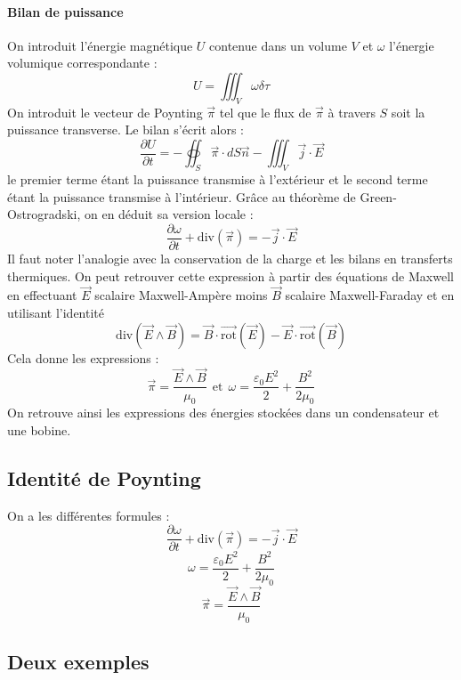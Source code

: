 \documentclass[french]{book}
\theoremstyle{plain}
\theoremstyle{definition}
\theoremstyle{remark}
\newcommand{\rot}{\overrightarrow{\text{rot}}}
\renewcommand{\div}{\text{div}}
\begin{document}
\paragraph{Bilan de puissance} On introduit l'énergie magnétique $U$ contenue dans un volume $V$ et $\omega$ l'énergie volumique correspondante : $$U=\iiint_V\omega\delta\tau$$ On introduit le vecteur de Poynting $\overrightarrow{\pi}$ tel que le flux de $\overrightarrow{\pi}$ à travers $S$ soit la puissance transverse. Le bilan s'écrit alors : $$\frac{\partial U}{\partial t}=-\oiint_S\overrightarrow{\pi}\cdot dS\overrightarrow{n}-\iiint_V\overrightarrow{j}\cdot\overrightarrow{E}$$ le premier terme étant la puissance transmise à l'extérieur et le second terme étant la puissance transmise à l'intérieur. Grâce au théorème de Green-Ostrogradski, on en déduit sa version locale : $$\frac{\partial\omega}{\partial t}+\div\left(\overrightarrow{\pi}\right)=-\overrightarrow{j}\cdot\overrightarrow{E}$$ Il faut noter l'analogie avec la conservation de la charge et les bilans en transferts thermiques. On peut retrouver cette expression à partir des équations de Maxwell en effectuant $\overrightarrow{E}$ scalaire Maxwell-Ampère moins $\overrightarrow{B}$ scalaire Maxwell-Faraday et en utilisant l'identité $$\div\left(\overrightarrow{E}\wedge\overrightarrow{B}\right)=\overrightarrow{B}\cdot\rot\left(\overrightarrow{E}\right)-\overrightarrow{E}\cdot\rot\left(\overrightarrow{B}\right)$$ Cela donne les expressions : $$\overrightarrow{\pi}=\frac{\overrightarrow{E}\wedge\overrightarrow{B}}{\mu_0} \ \ \text{et} \ \ \omega=\frac{\varepsilon_0E^2}{2}+\frac{B^2}{2\mu_0}$$
On retrouve ainsi les expressions des énergies stockées dans un condensateur et une bobine.
\subsection{Identité de Poynting}
On a les différentes formules : $$\frac{\partial\omega}{\partial t}+\div\left(\overrightarrow{\pi}\right)=-\overrightarrow{j}\cdot\overrightarrow{E}$$ $$\omega=\frac{\varepsilon_0E^2}{2}+\frac{B^2}{2\mu_0}$$ $$\overrightarrow{\pi}=\frac{\overrightarrow{E}\wedge\overrightarrow{B}}{\mu_0}$$
\subsection{Deux exemples}
\end{document}
